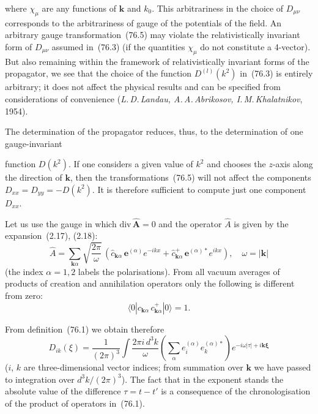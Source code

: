 where $\chi_\mu$ are any functions of $\mathbf{k}$ and $k_0$. This arbitrariness in the choice of $D_{\mu\nu}$ corresponds to the arbitrariness of gauge of the potentials of the field. An arbitrary gauge transformation~(76.5) may violate the relativistically invariant form of $D_{\mu\nu}$ assumed in~(76.3) (if the quantities $\chi_\mu$ do not constitute a 4-vector). But also remaining within the framework of relativistically invariant forms of the propagator, we see that the choice of the function $D^{(l)}(k^2)$ in~(76.3) is entirely arbitrary; it does not affect the physical results and can be specified from considerations of convenience (\textit{L.\,D.\,Landau, A.\,A.\,Abrikosov, I.\,M.\,Khalatnikov}, 1954).

The determination of the propagator reduces, thus, to the determination of one gauge-invariant

function $D(k^2)$. If one considers a given value of $k^2$ and chooses the $z$-axis along the direction of $\mathbf{k}$, then the transformations~(76.5) will not affect the components $D_{xx} = D_{yy} = -D(k^2)$. It is therefore sufficient to compute just one component $D_{xx}$.

Let us use the gauge in which $\mathrm{div}\,\hat{\mathbf{A}} = 0$ and the operator $\hat{A}$ is given by the expansion~(2.17), (2.18):
\begin{equation}
\hat{A} = \sum_{\mathbf{k}\alpha}\sqrt{\frac{2\pi}{\omega}}\,(\hat{c}_{\mathbf{k}\alpha}\,\mathbf{e}^{(\alpha)}e^{-ikx} + \hat{c}_{\mathbf{k}\alpha}^+\,\mathbf{e}^{(\alpha)*}e^{ikx}),\quad \omega = |\mathbf{k}|
\tag{76.6}
\end{equation}
(the index $\alpha = 1, 2$ labels the polarisations). From all vacuum averages of products of creation and annihilation operators only the following is different from zero:
\[
\langle 0|c_{\mathbf{k}\alpha}\,c_{\mathbf{k}\alpha}^+|0\rangle = 1.
\]

From definition~(76.1) we obtain therefore
\begin{equation}
D_{ik}(\xi) = \frac{1}{(2\pi)^3}\int\frac{2\pi i\,d^3k}{\omega}\left(\sum_\alpha e_i^{(\alpha)}e_k^{(\alpha)*}\right)e^{-i\omega|\tau|+i\mathbf{k}\boldsymbol{\xi}}
\tag{76.7}
\end{equation}
($i$, $k$ are three-dimensional vector indices; from summation over $\mathbf{k}$ we have passed to integration over $d^3k/(2\pi)^3$). The fact that in the exponent stands the absolute value of the difference $\tau = t - t'$ is a consequence of the chronologisation of the product of operators in~(76.1).


